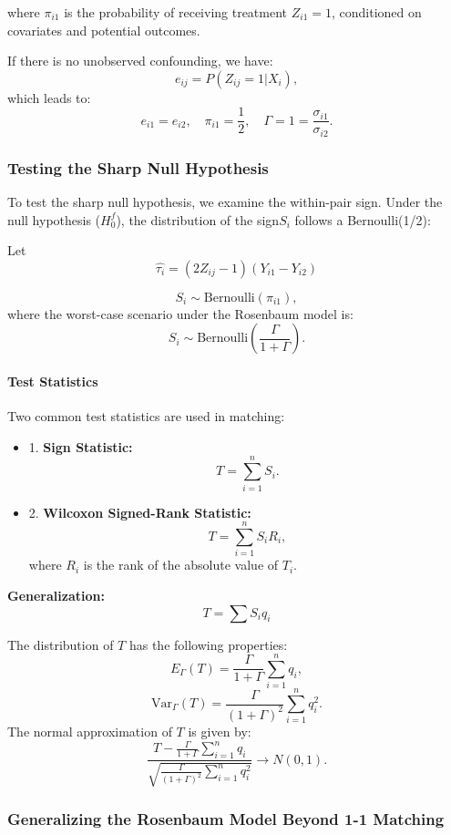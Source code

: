 where \(\pi_{i1}\) is the probability of receiving treatment \(Z_{i1} = 1\), conditioned on covariates and potential outcomes.

If there is no unobserved confounding, we have:
\[
e_{ij} = P(Z_{ij} = 1 | X_i),
\]
which leads to:
\[
e_{i1} = e_{i2}, \quad \pi_{i1} = \frac{1}{2}, \quad \Gamma = 1 = \frac{\sigma_{i1}}{\sigma_{i2}}.
\]

\subsubsection{Testing the Sharp Null Hypothesis}

To test the sharp null hypothesis, we examine the within-pair sign. Under the null hypothesis (\(H_0^f\)), the distribution of the sign\(S_i\) follows a Bernoulli(1/2):

Let 
\[\hat{\tau_i} = (2Z_{ij} - 1)(Y_{i1}- Y_{i2})\]

\[
S_i \sim \text{Bernoulli}(\pi_{i1}),
\]
where the worst-case scenario under the Rosenbaum model is:
\[
S_i \sim \text{Bernoulli}\left(\frac{\Gamma}{1 + \Gamma}\right).
\]

\paragraph{Test Statistics}

Two common test statistics are used in matching:
\begin{itemize}
    \item 1. \textbf{Sign Statistic:} 
   \[
   T = \sum_{i=1}^n S_i.
   \]
   \item  2. \textbf{Wilcoxon Signed-Rank Statistic:} 
   \[
   T = \sum_{i=1}^n S_i R_i,
   \]
   where \(R_i\) is the rank of the absolute value of \(T_i\).
\end{itemize}

\textbf{Generalization:}
   \[T = \sum S_i q_i\]
   
The distribution of \(T\) has the following properties:
\[
E_\Gamma(T) = \frac{\Gamma}{1 + \Gamma} \sum_{i=1}^n q_i,
\]
\[
\text{Var}_\Gamma(T) = \frac{\Gamma}{(1 + \Gamma)^2} \sum_{i=1}^n q_i^2.
\]
The normal approximation of \(T\) is given by:
\[
\frac{T - \frac{\Gamma}{1 + \Gamma} \sum_{i=1}^n q_i}{\sqrt{\frac{\Gamma}{(1 + \Gamma)^2} \sum_{i=1}^n q_i^2}} \to N(0, 1).
\]

\subsubsection{Generalizing the Rosenbaum Model Beyond 1-1 Matching}

